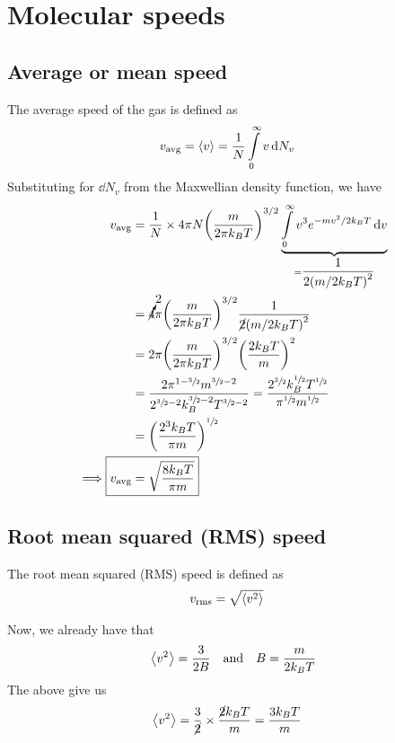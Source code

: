 \section{Molecular speeds}

	\subsection{Average or mean speed}
		The average speed of the gas is defined as
		\begin{align*}
			v_\text{avg}=\expval{v}&=\dfrac{1}{N}\int\limits_{0}^{\infty}{v\dd{N_v}}
		\end{align*}
		Substituting for $\dd{N_v}$ from the Maxwellian density function, we have
		\begin{align*}
			v_\text{avg}&=\dfrac{1}{N}\times 4\pi N\qty(\dfrac{m}{2\pi k_BT})^{3/2}\underbrace{\int\limits_{0}^{\infty}{v^3e^{-mv^2/2k_BT}\dd{v}}}_{=\dfrac{1}{2\qty(m/2k_BT)^2}} \\
				&=\cancelto{2}{4}\pi\qty(\dfrac{m}{2\pi k_BT})^{3/2}\dfrac{1}{\cancel{2}\qty(m/2k_BT)^2} \\
				&=2\pi\qty(\dfrac{m}{2\pi k_BT})^{3/2}\qty(\dfrac{2k_BT}{m})^2 \\
				&=\dfrac{2\pi^{1-\sfrac{3}{2}}m^{\sfrac{3}{2}-2}}{2^{\sfrac{3}{2}-2}k_B^{\sfrac{3}{2}-2}T^{\sfrac{3}{2}-2}}=\dfrac{2^{\sfrac{3}{2}}k_B^{\sfrac{1}{2}}T^{\sfrac{1}{2}}}{\pi^{\sfrac{1}{2}}m^{\sfrac{1}{2}}} \\
				&=\qty(\dfrac{2^3k_BT}{\pi m})^{\sfrac{1}{2}} \\
			\implies\Aboxed{v_\text{avg}&=\sqrt{\dfrac{8k_BT}{\pi m}}}
		\end{align*}
	
	\subsection{Root mean squared (RMS) speed}
		The root mean squared (RMS) speed is defined as
		\begin{align*}
			v_\text{rms}&=\sqrt{\expval{v^2}}
		\end{align*}
		
		Now, we already have that
		\begin{align*}
			\expval{v^2}=\dfrac{3}{2B}\qq{and}B=\dfrac{m}{2k_BT}
		\end{align*}
		The above give us
		\begin{align*}
			\expval{v^2}&=\dfrac{3}{\cancel{2}}\times\dfrac{\cancel{2}k_BT}{m}=\dfrac{3k_BT}{m}
		\end{align*}
		

